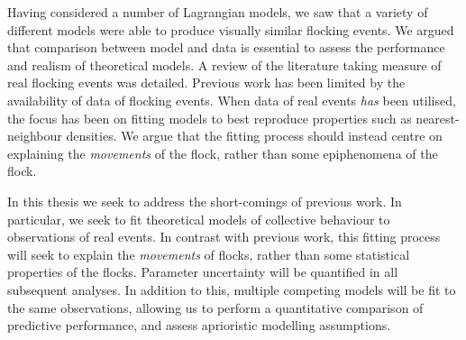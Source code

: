Having considered a number of Lagrangian models, we saw that a variety of
different models were able to produce visually similar flocking events. We
argued that comparison between model and data is essential to assess the
performance and realism of theoretical models. A review of the literature
taking measure of real flocking events was detailed. Previous work has been
limited by the availability of data of flocking events. When data of real
events \emph{has} been utilised, the focus has been on fitting models to best
reproduce properties such as nearest-neighbour densities. We argue that the
fitting process should instead centre on explaining the \emph{movements} of the
flock, rather than some epiphenomena of the flock.

In this thesis we seek to address the short-comings of previous work. In
particular, we seek to fit theoretical models of collective behaviour to
observations of real events. In contrast with previous work, this fitting
process will seek to explain the \emph{movements} of flocks, rather than some
statistical properties of the flocks. Parameter uncertainty will be quantified
in all subsequent analyses. In addition to this, multiple competing models will
be fit to the same observations, allowing us to perform a quantitative
comparison of predictive performance, and assess aprioristic modelling
assumptions.
